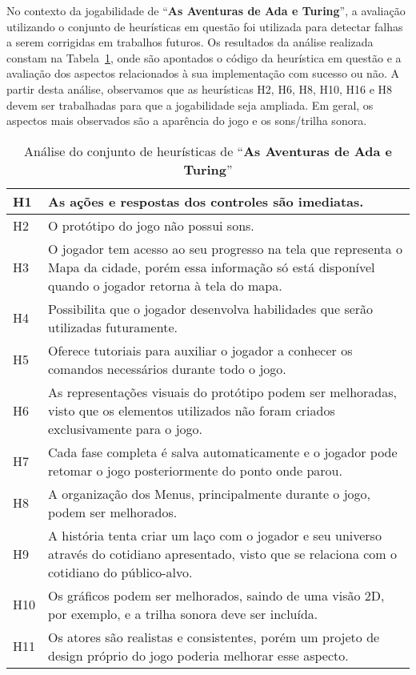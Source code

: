 No contexto da jogabilidade de “\textbf{As Aventuras de Ada e Turing}”, a avaliação utilizando o conjunto de heurísticas em questão foi utilizada para detectar falhas a serem corrigidas em trabalhos futuros. Os resultados da análise realizada constam na Tabela~\ref{tab:analise_heuristica}, onde são apontados o código da heurística em questão e a avaliação dos aspectos relacionados à sua implementação com sucesso ou não. A partir desta análise, observamos que as heurísticas H2, H6, H8, H10, H16 e H8 devem ser trabalhadas para que a jogabilidade seja ampliada. Em geral, os aspectos mais observados são a aparência do jogo e os sons/trilha sonora. 

\begin{table}[H]
\centering
\caption{Análise do conjunto de heurísticas de “\textbf{As Aventuras de Ada e Turing}”}
\label{tab:analise_heuristica}
\begin{tabular}{|l|p{14cm}|}
\hline
H1  & As ações e respostas dos controles são imediatas. \\ \hline
H2  & O protótipo do jogo não possui sons. \\ \hline
H3  & O jogador tem acesso ao seu progresso na tela que representa o Mapa da cidade, porém essa informação só está disponível quando o jogador retorna à tela do mapa. \\ \hline
H4  & Possibilita que o jogador desenvolva habilidades que serão utilizadas futuramente. \\ \hline
H5  & Oferece tutoriais para auxiliar o jogador a conhecer os comandos necessários durante todo o jogo. \\ \hline
H6  & As representações visuais do protótipo podem ser melhoradas, visto que os elementos utilizados não foram criados exclusivamente para o jogo. \\ \hline
H7  & Cada fase completa é salva automaticamente e o jogador pode retomar o jogo posteriormente do ponto onde parou. \\ \hline
H8  & A organização dos Menus, principalmente durante o jogo, podem ser melhorados. \\ \hline
H9  & A história tenta criar um laço com o jogador e seu universo através do cotidiano apresentado, visto que se relaciona com o cotidiano do público-alvo. \\ \hline
H10 & Os gráficos podem ser melhorados, saindo de uma visão 2D, por exemplo, e a trilha sonora deve ser incluída. \\ \hline
H11 & Os atores são realistas e consistentes, porém um projeto de design próprio do jogo poderia melhorar esse aspecto. \\ \hline

\end{tabular}
\end{table}
